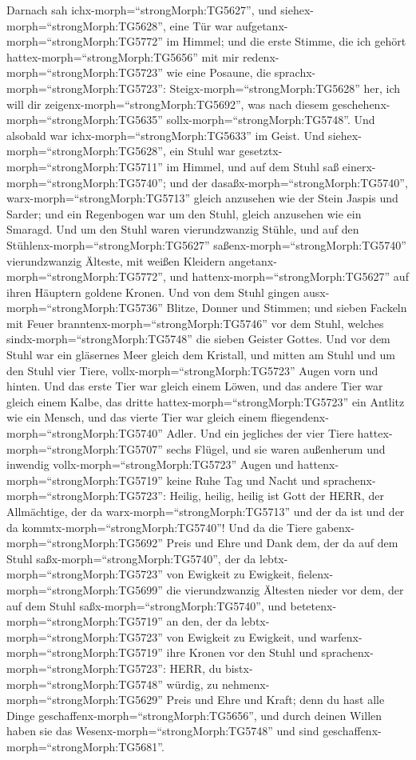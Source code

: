  Darnach sah ichx-morph=``strongMorph:TG5627'', und
siehex-morph=``strongMorph:TG5628'', eine Tür war
aufgetanx-morph=``strongMorph:TG5772'' im Himmel; und die erste Stimme,
die ich gehört hattex-morph=``strongMorph:TG5656'' mit mir
redenx-morph=``strongMorph:TG5723'' wie eine Posaune, die
sprachx-morph=``strongMorph:TG5723'':
Steigx-morph=``strongMorph:TG5628'' her, ich will dir
zeigenx-morph=``strongMorph:TG5692'', was nach diesem
geschehenx-morph=``strongMorph:TG5635''
sollx-morph=``strongMorph:TG5748''.  Und alsobald war
ichx-morph=``strongMorph:TG5633'' im Geist. Und
siehex-morph=``strongMorph:TG5628'', ein Stuhl war
gesetztx-morph=``strongMorph:TG5711'' im Himmel, und auf dem Stuhl saß
einerx-morph=``strongMorph:TG5740'';  und der
dasaßx-morph=``strongMorph:TG5740'', warx-morph=``strongMorph:TG5713''
gleich anzusehen wie der Stein Jaspis und Sarder; und ein Regenbogen war
um den Stuhl, gleich anzusehen wie ein Smaragd.  Und um den
Stuhl waren vierundzwanzig Stühle, und auf den
Stühlenx-morph=``strongMorph:TG5627''
saßenx-morph=``strongMorph:TG5740'' vierundzwanzig Älteste, mit weißen
Kleidern angetanx-morph=``strongMorph:TG5772'', und
hattenx-morph=``strongMorph:TG5627'' auf ihren Häuptern goldene Kronen.
 Und von dem Stuhl gingen ausx-morph=``strongMorph:TG5736''
Blitze, Donner und Stimmen; und sieben Fackeln mit Feuer
branntenx-morph=``strongMorph:TG5746'' vor dem Stuhl, welches
sindx-morph=``strongMorph:TG5748'' die sieben Geister Gottes.
 Und vor dem Stuhl war ein gläsernes Meer gleich dem
Kristall, und mitten am Stuhl und um den Stuhl vier Tiere,
vollx-morph=``strongMorph:TG5723'' Augen vorn und hinten. 
Und das erste Tier war gleich einem Löwen, und das andere Tier war
gleich einem Kalbe, das dritte hattex-morph=``strongMorph:TG5723'' ein
Antlitz wie ein Mensch, und das vierte Tier war gleich einem
fliegendenx-morph=``strongMorph:TG5740'' Adler.  Und ein
jegliches der vier Tiere hattex-morph=``strongMorph:TG5707'' sechs
Flügel, und sie waren außenherum und inwendig
vollx-morph=``strongMorph:TG5723'' Augen und
hattenx-morph=``strongMorph:TG5719'' keine Ruhe Tag und Nacht und
sprachenx-morph=``strongMorph:TG5723'': Heilig, heilig, heilig ist Gott
der HERR, der Allmächtige, der da warx-morph=``strongMorph:TG5713'' und
der da ist und der da kommtx-morph=``strongMorph:TG5740''! 
Und da die Tiere gabenx-morph=``strongMorph:TG5692'' Preis und Ehre und
Dank dem, der da auf dem Stuhl saßx-morph=``strongMorph:TG5740'', der da
lebtx-morph=``strongMorph:TG5723'' von Ewigkeit zu Ewigkeit,
 fielenx-morph=``strongMorph:TG5699'' die vierundzwanzig
Ältesten nieder vor dem, der auf dem Stuhl
saßx-morph=``strongMorph:TG5740'', und
betetenx-morph=``strongMorph:TG5719'' an den, der da
lebtx-morph=``strongMorph:TG5723'' von Ewigkeit zu Ewigkeit, und
warfenx-morph=``strongMorph:TG5719'' ihre Kronen vor den Stuhl und
sprachenx-morph=``strongMorph:TG5723'':  HERR, du
bistx-morph=``strongMorph:TG5748'' würdig, zu
nehmenx-morph=``strongMorph:TG5629'' Preis und Ehre und Kraft; denn du
hast alle Dinge geschaffenx-morph=``strongMorph:TG5656'', und durch
deinen Willen haben sie das Wesenx-morph=``strongMorph:TG5748'' und sind
geschaffenx-morph=``strongMorph:TG5681''.

